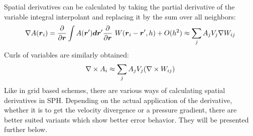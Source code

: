 Spatial derivatives can be calculated by taking the partial derivative of the variable integral interpolant  and replacing it by the sum over all neighbors:
\begin{equation}
\label{ch02_sph01_eq005}
\nabla A(\boldsymbol{r}_i) = \frac{\partial}{\partial \boldsymbol{r}}\int A(\boldsymbol{r}') \boldsymbol{d} \boldsymbol{r}' \frac{\partial}{\partial \boldsymbol{r}}\ W(\boldsymbol{r}_i - \boldsymbol{r}', h) + O(h^2)
\approx \sum_{j} A_j V_{j} \nabla W_{ij} 
\end{equation}
Curls of variables are similarly obtained:
\begin{equation}
\label{ch02_sph01_eq006}
\nabla \times A_i \approx \sum_{j} A_j V_{j} (\nabla \times W_{ij})
\end{equation}
Like in grid based schemes, there are various ways of calculating spatial derivatives in SPH.
Depending on the actual application of the derivative, whether it is to get the velocity divergence or a pressure gradient, there are better suited variants which show better error behavior. They will be presented further below.

